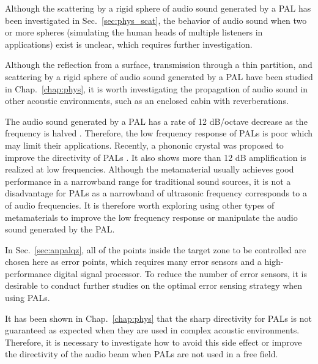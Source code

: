 \begin{outline}
    \1 Although the scattering by a rigid sphere of audio sound generated by a PAL has been {investigated} in Sec.~\ref{sec:phys_scat},
    the behavior of audio sound when two or more spheres (simulating the human heads of multiple listeners in applications) exist is unclear, which requires further investigation.

    \1 Although the reflection from a surface, transmission through a thin partition, and scattering by a rigid sphere of audio sound generated by a PAL have been studied in Chap.~\ref{chap:phys}, it is worth investigating the propagation of audio sound in other acoustic environments, such as an enclosed cabin with reverberations.

    \1 
    {
        The audio sound generated by a PAL has a rate of 12 dB/octave decrease as the frequency is halved \cite{Yoneyama1983AudioSpotlightApplication}. 
        Therefore, the low frequency response of PALs is poor which may limit their applications. 
        Recently, a phononic crystal was proposed to improve the directivity of PALs \cite{Cervenka2021ParametricAcousticArray}. 
        It also shows more than 12 dB amplification is realized at low frequencies.
        Although the metamaterial usually achieves good performance in a narrowband range for traditional sound sources, it is not a disadvantage for PALs as a narrowband of ultrasonic frequency corresponds to a  of audio frequencies.
        It is therefore worth exploring using other types of metamaterials to improve the low frequency response or manipulate the audio sound generated by the PAL. 
    }

    \1 In Sec.~\ref{sec:anpalqz}, all of the points inside the target zone  to be controlled are chosen here as error points, which requires many error sensors and a high-performance digital signal processor. 
    To reduce the number of error sensors, it is desirable to conduct further studies on the optimal error sensing strategy when using PALs. 
    
    \1 {It has been shown in Chap.~\ref{chap:phys} that the sharp directivity for PALs is not guaranteed as expected when they are used in complex acoustic environments. 
        Therefore, it is necessary to investigate how to avoid this side effect or improve the directivity of the audio beam when PALs are not used in a free field.
    }
    

\end{outline}
